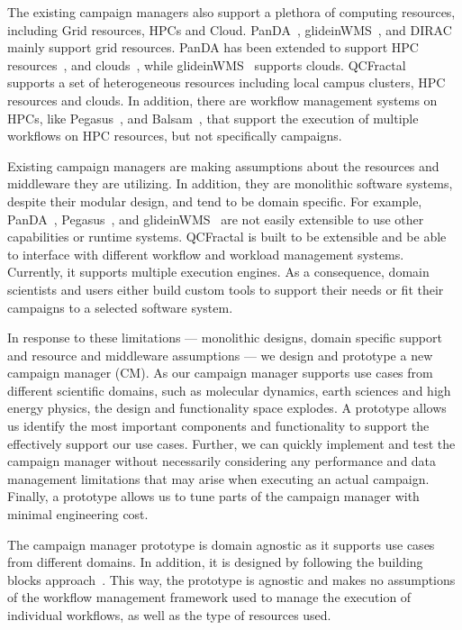 The existing campaign managers also support a plethora of computing resources, including Grid resources, HPCs and Cloud.
PanDA~\cite{maeno2008panda}, glideinWMS~\cite{sfiligoi2008glidein}, and DIRAC~\cite{casajus2010dirac} mainly support grid resources.
PanDA has been extended to support HPC resources~\cite{de2015future, de2016accelerating}, and clouds~\cite{de2016accelerating}, while glideinWMS~\cite{sfiligoi2008glidein} supports clouds.
QCFractal~\cite{qcfractal} supports a set of heterogeneous resources including local campus clusters, HPC resources and clouds.
In addition, there are workflow management systems on HPCs, like Pegasus~\cite{deelman2015pegasus}, and Balsam~\cite{salim2019balsam}, that support the execution of multiple workflows on HPC resources, but not specifically campaigns.

Existing campaign managers are making assumptions about the resources and middleware they are utilizing.
In addition, they are monolithic software systems, despite their modular design, and tend to be domain specific.
For example, PanDA~\cite{maeno2008panda}, Pegasus~\cite{deelman2015pegasus}, and glideinWMS~\cite{sfiligoi2008glidein} are not easily extensible to use other capabilities or runtime systems.
QCFractal is built to be extensible and be able to interface with different workflow and workload management systems.
Currently, it supports multiple execution engines.
As a consequence, domain scientists and users either build custom tools to support their needs or fit their campaigns to a selected software system.

In response to these limitations --- monolithic designs, domain specific support and resource and middleware assumptions --- we design and prototype a new campaign manager (CM).
As our campaign manager supports use cases from different scientific domains, such as molecular dynamics, earth sciences and high energy physics, the design and functionality space explodes.
A prototype allows us identify the most important components and functionality to support the effectively support our use cases.
Further, we can quickly implement and test the campaign manager without necessarily considering any performance and data management limitations that may arise when executing an actual campaign.
Finally, a prototype allows us to tune parts of the campaign manager with minimal engineering cost.

The campaign manager prototype is domain agnostic as it supports use cases from different domains.
In addition, it is designed by following the building blocks approach~\cite{turilli2019middleware}.
This way, the prototype is agnostic and makes no assumptions of the workflow management framework used to manage the execution of individual workflows, as well as the type of resources used.

